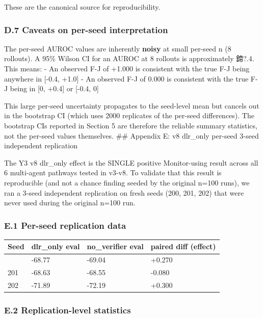 \documentclass[11pt]{article}
\begin{document}
These are the canonical source for reproducibility.

\subsubsection{D.7 Caveats on per-seed
interpretation}\label{d.7-caveats-on-per-seed-interpretation}

The per-seed AUROC values are inherently \textbf{noisy} at small
per-seed n (8 rollouts). A 95\% Wilson CI for an AUROC at 8 rollouts is
approximately 鍗?.4. This means: - An observed F-J of +1.000 is
consistent with the true F-J being anywhere in {[}-0.4, +1.0{]} - An
observed F-J of 0.000 is consistent with the true F-J being in {[}0,
+0.4{]} or {[}-0.4, 0{]}

This large per-seed uncertainty propagates to the seed-level mean but
cancels out in the bootstrap CI (which uses 2000 replicates of the
per-seed differences). The bootstrap CIs reported in Section 5 are
therefore the reliable summary statistics, not the per-seed values
themselves. \#\# Appendix E: v8 dlr\_only per-seed 3-seed independent
replication

The Y3 v8 dlr\_only effect is the SINGLE positive Monitor-using result
across all 6 multi-agent pathways tested in v3-v8. To validate that this
result is reproducible (and not a chance finding seeded by the original
n=100 runs), we ran a 3-seed independent replication on fresh seeds
(200, 201, 202) that were never used during the original n=100 run.

\subsubsection{E.1 Per-seed replication
data}\label{e.1-per-seed-replication-data}

{\def\LTcaptype{none} %
\begin{longtable}[]{@{}llll@{}}
\toprule\noalign{}
Seed & dlr\_only eval & no\_verifier eval & paired diff (effect) \\
\midrule\noalign{}
\endhead
\bottomrule\noalign{}
\endlastfoot
200 & -68.77 & -69.04 & +0.270 \\
201 & -68.63 & -68.55 & -0.080 \\
202 & -71.89 & -72.19 & +0.300 \\
\end{longtable}
}

\subsubsection{E.2 Replication-level
statistics}\label{e.2-replication-level-statistics}
\end{document}
